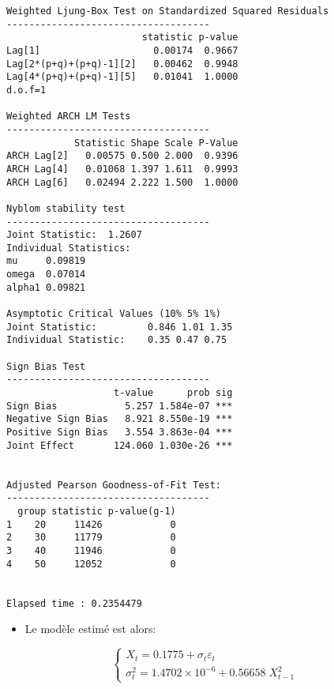 \documentclass[
  ignorenonframetext,
]{beamer}
\providecommand{\tightlist}{%
  \setlength{\itemsep}{0pt}\setlength{\parskip}{0pt}}
\begin{document}
\begin{frame}[fragile]
\begin{verbatim}
Weighted Ljung-Box Test on Standardized Squared Residuals
------------------------------------
                        statistic p-value
Lag[1]                    0.00174  0.9667
Lag[2*(p+q)+(p+q)-1][2]   0.00462  0.9948
Lag[4*(p+q)+(p+q)-1][5]   0.01041  1.0000
d.o.f=1

Weighted ARCH LM Tests
------------------------------------
            Statistic Shape Scale P-Value
ARCH Lag[2]   0.00575 0.500 2.000  0.9396
ARCH Lag[4]   0.01068 1.397 1.611  0.9993
ARCH Lag[6]   0.02494 2.222 1.500  1.0000

Nyblom stability test
------------------------------------
Joint Statistic:  1.2607
Individual Statistics:              
mu     0.09819
omega  0.07014
alpha1 0.09821

Asymptotic Critical Values (10% 5% 1%)
Joint Statistic:         0.846 1.01 1.35
Individual Statistic:    0.35 0.47 0.75

Sign Bias Test
------------------------------------
                   t-value      prob sig
Sign Bias            5.257 1.584e-07 ***
Negative Sign Bias   8.921 8.550e-19 ***
Positive Sign Bias   3.554 3.863e-04 ***
Joint Effect       124.060 1.030e-26 ***


Adjusted Pearson Goodness-of-Fit Test:
------------------------------------
  group statistic p-value(g-1)
1    20     11426            0
2    30     11779            0
3    40     11946            0
4    50     12052            0


Elapsed time : 0.2354479 
\end{verbatim}
\end{frame}

\begin{frame}
\begin{itemize}[<+->]
\tightlist
\item
  Le modèle estimé est alors:
\end{itemize}

\[
\begin{cases}
X_t=0.1775+\sigma_t \varepsilon_t\\
\sigma^2_t=1.4702 \times 10^{-6}+0.56658\; X^2_{t-1}
\end{cases}
\]
\end{frame}
\end{document}

